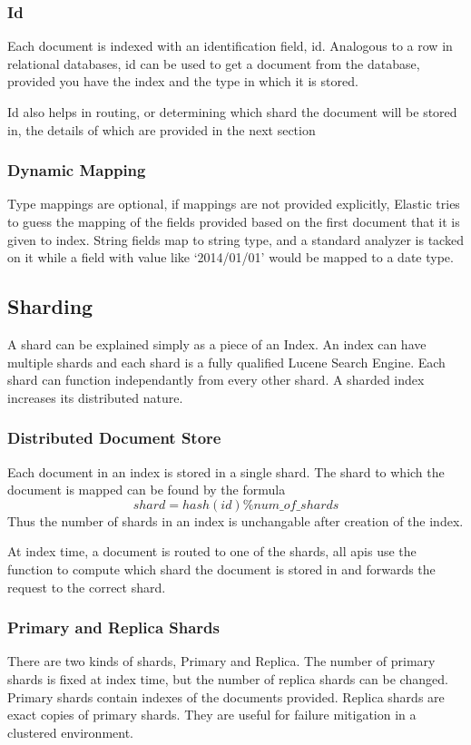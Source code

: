 \documentclass[12pt]{article}
\begin{document}
			\subsubsection{Id}
			Each document is indexed with an identification field, id. Analogous to a row in relational databases, id can be used to get a document from the database, provided you have the index and the type in which it is stored. 

			Id also helps in routing, or determining which shard the document will be stored in, the details of which are provided in the next section

			\subsubsection{Dynamic Mapping}
			Type mappings are optional, if mappings are not provided explicitly, Elastic tries to guess the mapping of the fields provided based on the first document that it is given to index. String fields map to string type, and a standard analyzer is tacked on it while a field with value like `2014/01/01' would be mapped to a date type.

		\subsection{Sharding}
			A shard can be explained simply as a piece of an Index. An index can have multiple shards and each shard is a fully qualified Lucene Search Engine. Each shard can function independantly from every other shard. A sharded index increases its distributed nature.
			\subsubsection{Distributed Document Store}
				Each document in an index is stored in a single shard. The shard to which the document is mapped can be found by the formula \[ shard = hash(id) \% num\_of\_shards\] Thus the number of shards in an index is unchangable after creation of the index.

				At index time, a document is routed to one of the shards, all \ac{api}s use the function to compute which shard the document is stored in and forwards the request to the correct shard.
			\subsubsection{Primary and Replica Shards}
				There are two kinds of shards, Primary and Replica. The number of primary shards is fixed at index time, but the number of replica shards can be changed. Primary shards contain indexes of the documents provided. Replica shards are exact copies of primary shards. They are useful for failure mitigation in a clustered environment.
\end{document}
